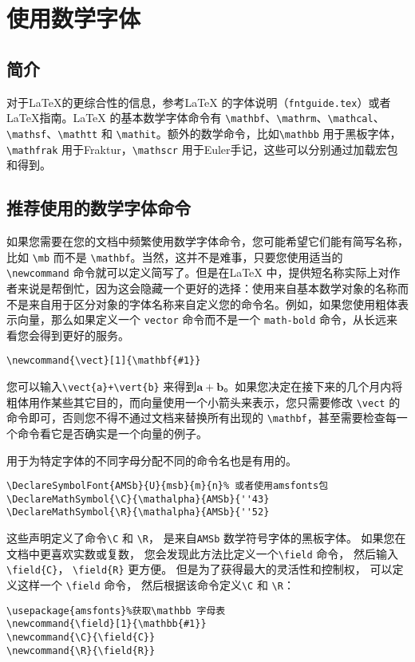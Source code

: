 
\chapter{使用数学字体}
\section{简介}
对于\LaTeX 的更综合性的信息，参考\LaTeX{} 的字体说明（\verb|fntguide.tex|）或者\LaTeX 指南\cite{4}。\LaTeX{} 的基本数学字体命令有 \verb|\mathbf|、\verb|\mathrm|、\verb|\mathcal|、\verb|\mathsf|、\verb|\mathtt| 和 \verb|\mathit|。额外的数学命令，比如\verb|\mathbb| 用于黑板字体，  \verb|\mathfrak| 用于Fraktur，\verb|\mathscr| 用于Euler手记，这些可以分别通过加载宏包和得到。
\section{推荐使用的数学字体命令}
如果您需要在您的文档中频繁使用数学字体命令，您可能希望它们能有简写名称，比如 \verb|\mb| 而不是 \verb|\mathbf|。当然，这并不是难事，只要您使用适当的 \verb|\newcommand| 命令就可以定义简写了。但是在\LaTeX{} 中，提供短名称实际上对作者来说是帮倒忙，因为这会隐藏一个更好的选择：使用来自基本数学对象的名称而不是来自用于区分对象的字体名称来自定义您的命令名。例如，如果您使用粗体表示向量，那么如果定义一个 \verb|vector| 命令而不是一个 \verb|math-bold| 命令，从长远来看您会得到更好的服务。
\begin{verbatim}
\newcommand{\vect}[1]{\mathbf{#1}}
\end{verbatim}
您可以输入\verb|\vect{a}+\vert{b}| 来得到$\mathbf a+\mathbf b$。如果您决定在接下来的几个月内将粗体用作某些其它目的，而向量使用一个小箭头来表示，您只需要修改 \verb|\vect| 的命令即可，否则您不得不通过文档来替换所有出现的 \verb|\mathbf|，甚至需要检查每一个命令看它是否确实是一个向量的例子。

用于为特定字体的不同字母分配不同的命令名也是有用的。
\begin{verbatim}
\DeclareSymbolFont{AMSb}{U}{msb}{m}{n}% 或者使用amsfonts包
\DeclareMathSymbol{\C}{\mathalpha}{AMSb}{''43}
\DeclareMathSymbol{\R}{\mathalpha}{AMSb}{''52}
\end{verbatim}

这些声明定义了命令\verb|\C| 和 \verb|\R|，  是来自\verb|AMSb| 数学符号字体的黑板字体。 如果您在文档中更喜欢实数或复数，  您会发现此方法比定义一个\verb|\field| 命令，  然后输入\verb|\field{C}|，  \verb|\field{R}| 更方便。 但是为了获得最大的灵活性和控制权，  可以定义这样一个 \verb|\field| 命令，  然后根据该命令定义\verb|\C| 和 \verb|\R|：
\begin{verbatim}
\usepackage{amsfonts}%获取\mathbb 字母表
\newcommand{\field}[1}{\mathbb{#1}}
\newcommand{\C}{\field{C}}
\newcommand{\R}{\field{R}}
\end{verbatim}
